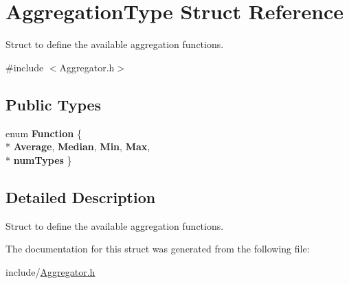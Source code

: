\hypertarget{structAggregationType}{\section{Aggregation\-Type Struct Reference}
\label{structAggregationType}
}


Struct to define the available aggregation functions.  




{\ttfamily \#include $<$Aggregator.\-h$>$}

\subsection*{Public Types}
\begin{DoxyCompactItemize}
\item 
enum {\bfseries Function} \{ \\*
{\bfseries Average}, 
{\bfseries Median}, 
{\bfseries Min}, 
{\bfseries Max}, 
\\*
{\bfseries num\-Types}
 \}
\end{DoxyCompactItemize}


\subsection{Detailed Description}
Struct to define the available aggregation functions. 

The documentation for this struct was generated from the following file\-:\begin{DoxyCompactItemize}
\item 
include/\hyperlink{Aggregator_8h}{Aggregator.\-h}\end{DoxyCompactItemize}
